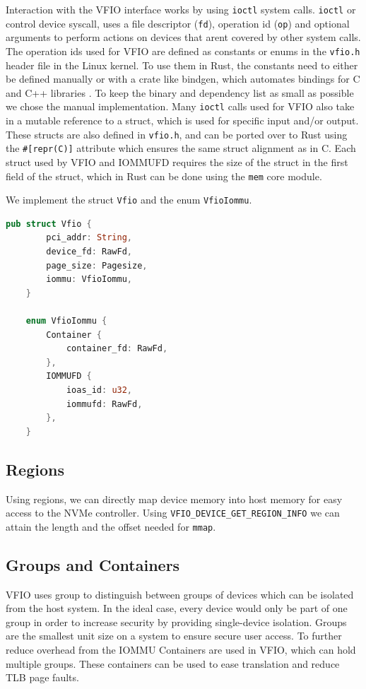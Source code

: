 Interaction with the VFIO interface works by using \texttt{ioctl} system calls.
\texttt{ioctl} or control device syscall, uses a file descriptor (\texttt{fd}), operation id (\texttt{op}) and optional arguments to perform actions on devices that arent covered by other system calls.
The operation ids used for VFIO are defined as constants or enums in the \texttt{vfio.h} header file in the Linux kernel. To use them in Rust, the constants need to either be defined manually or with a crate like bindgen, which automates bindings for C and C++ libraries \cite{cratebindgen}. To keep the binary and dependency list as small as possible we chose the manual implementation.
Many \texttt{ioctl} calls used for VFIO also take in a mutable reference to a struct, which is used for specific input and/or output. These structs are also defined in \texttt{vfio.h}, and can be ported over to Rust using the \texttt{\#[repr(C)]} attribute which ensures the same struct alignment as in C. Each struct used by VFIO and IOMMUFD requires the size of the struct in the first field of the struct, which in Rust can be done using the \texttt{mem} core module.

We implement the struct \texttt{Vfio} and the enum \texttt{VfioIommu}.

\begin{lstlisting}[language=Rust,caption={Structs used to model VFIO}, label=lst:vfiostructs]
    pub struct Vfio {
        pci_addr: String,
        device_fd: RawFd,
        page_size: Pagesize,
        iommu: VfioIommu,
    }

    enum VfioIommu {
        Container {
            container_fd: RawFd,
        },
        IOMMUFD {
            ioas_id: u32,
            iommufd: RawFd,
        },
    }
\end{lstlisting}

\subsection{Regions}
Using regions, we can directly map device memory into host memory for easy access to the NVMe controller.
Using \texttt{VFIO\_DEVICE\_GET\_REGION\_INFO} we can attain the length and the offset needed for \texttt{mmap}. %

\subsection{Groups and Containers}
VFIO uses group to distinguish between groups of devices which can be isolated from the host system. In the ideal case, every device would only be part of one group in order to increase security by providing single-device isolation. Groups are the smallest unit size on a system to ensure secure user access.
To further reduce overhead from the IOMMU Containers are used in VFIO, which can hold multiple groups. These containers can be used to ease translation and reduce TLB page faults.

